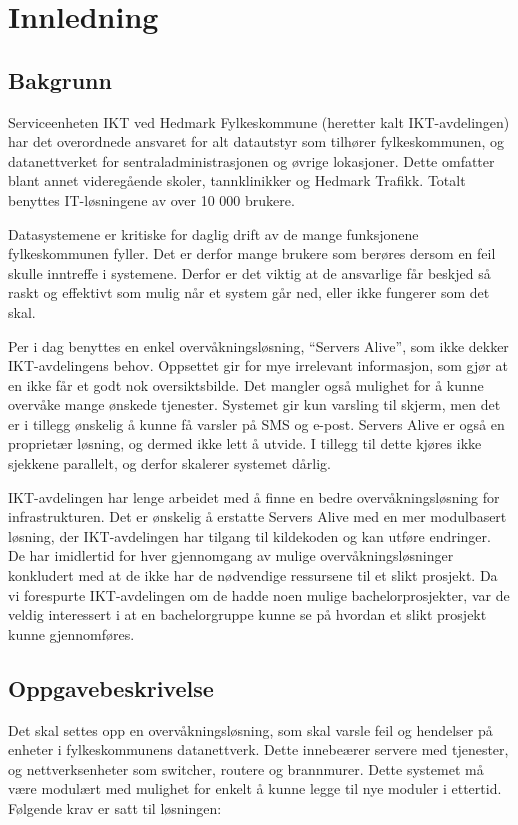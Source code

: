 \chapter{Innledning}
\section{Bakgrunn}
Serviceenheten IKT ved Hedmark Fylkeskommune (heretter kalt IKT-avdelingen) har det overordnede ansvaret for alt datautstyr som tilhører fylkeskommunen, og datanettverket for sentraladministrasjonen og øvrige lokasjoner. Dette omfatter blant annet videregående skoler, tannklinikker og Hedmark Trafikk. Totalt benyttes IT-løsningene av over 10 000 brukere.

Datasystemene er kritiske for daglig drift av de mange funksjonene fylkeskommunen fyller. Det er derfor mange brukere som berøres dersom en feil skulle inntreffe i systemene. Derfor er det viktig at de ansvarlige får beskjed så raskt og effektivt som mulig når et system går ned, eller ikke fungerer som det skal.

Per i dag benyttes en enkel overvåkningsløsning, ``Servers Alive''\cite{servers}, som ikke dekker IKT-avdelingens behov. Oppsettet gir for mye irrelevant informasjon, som gjør at en ikke får et godt nok oversiktsbilde. Det mangler også mulighet for å kunne overvåke mange ønskede tjenester. Systemet gir kun varsling til skjerm, men det er i tillegg ønskelig å kunne få varsler på SMS og e-post. Servers Alive er også en proprietær løsning, og dermed ikke lett å utvide. I tillegg til dette kjøres ikke sjekkene parallelt, og derfor skalerer systemet dårlig.

IKT-avdelingen har lenge arbeidet med å finne en bedre overvåkningsløsning for infrastrukturen. Det er ønskelig å erstatte Servers Alive med en mer modulbasert løsning, der IKT-avdelingen har tilgang til kildekoden og kan utføre endringer. De har imidlertid for hver gjennomgang av mulige overvåkningsløsninger konkludert med at de ikke har de nødvendige ressursene til et slikt prosjekt. Da vi forespurte IKT-avdelingen om de hadde noen mulige bachelorprosjekter, var de veldig interessert i at en bachelorgruppe kunne se på hvordan et slikt prosjekt kunne gjennomføres.

\section*{Oppgavebeskrivelse}
Det skal settes opp en overvåkningsløsning, som skal varsle feil og hendelser på enheter i fylkeskommunens datanettverk. Dette innebeærer servere med tjenester, og nettverksenheter som switcher, routere og brannmurer. Dette systemet må være modulært med mulighet for enkelt å kunne legge til nye moduler i ettertid. Følgende krav er satt til løsningen:

